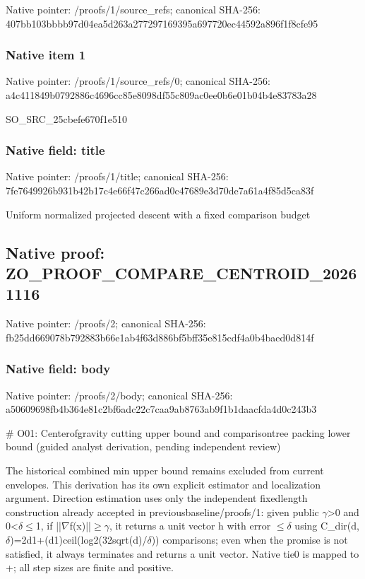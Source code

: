 \documentclass[10pt,a4paper]{article}
\begin{document}
Native pointer: /proofs/1/source\_refs; canonical SHA-256: 407bb103bbbb97d04ea5d263\allowbreak{}a277297169395a697720ec44\allowbreak{}592a896f1f8cfe95



\subsubsection{Native item 1}


Native pointer: /proofs/1/source\_refs/0; canonical SHA-256: a4c411849b0792886c4696cc\allowbreak{}85e8098df55c809ac0ee0b6e\allowbreak{}01b04b4e83783a28


SO\_SRC\_25cbefe670f1e510


\subsubsection{Native field: title}


Native pointer: /proofs/1/title; canonical SHA-256: 7fe7649926b931b42b17c4e6\allowbreak{}6f47c266ad0c47689e3d70de\allowbreak{}7a61a4f85d5ca83f


Uniform normalized projected descent with a fixed comparison budget


\subsection{Native proof: ZO\_PROOF\_COMPARE\_CENTROID\_20261116}


Native pointer: /proofs/2; canonical SHA-256: fb25dd669078b792883b66e1\allowbreak{}ab4f63d886bf5bff35e815cd\allowbreak{}f4a0b4baed0d814f



\subsubsection{Native field: body}


Native pointer: /proofs/2/body; canonical SHA-256: a50609698fb4b364e81c2bf6\allowbreak{}adc22c7caa9ab8763ab9f1b1\allowbreak{}daacfda4d0c243b3


\# O01: Centerofgravity cutting upper bound and comparisontree packing lower bound (guided analyst derivation, pending independent review)

The historical combined min upper bound remains excluded from current envelopes. This derivation has its own explicit estimator and localization argument. Direction estimation uses only the independent fixedlength construction already accepted in previousbaseline/proofs/1: given public \ensuremath{\gamma}>0 and 0<\ensuremath{\delta}\ensuremath{\le}1, if ||\ensuremath{\nabla}f(x)||\ensuremath{\ge}\ensuremath{\gamma}, it returns a unit vector h with error \ensuremath{\le}\ensuremath{\delta} using C\_dir(d,\ensuremath{\delta})=2d1+(d1)cei\allowbreak{}l(log2(32sqrt(d)/\ensuremath{\delta})) comparisons; even when the promise is not satisfied, it always terminates and returns a unit vector. Native tie0 is mapped to +; all step sizes are finite and positive.
\end{document}
